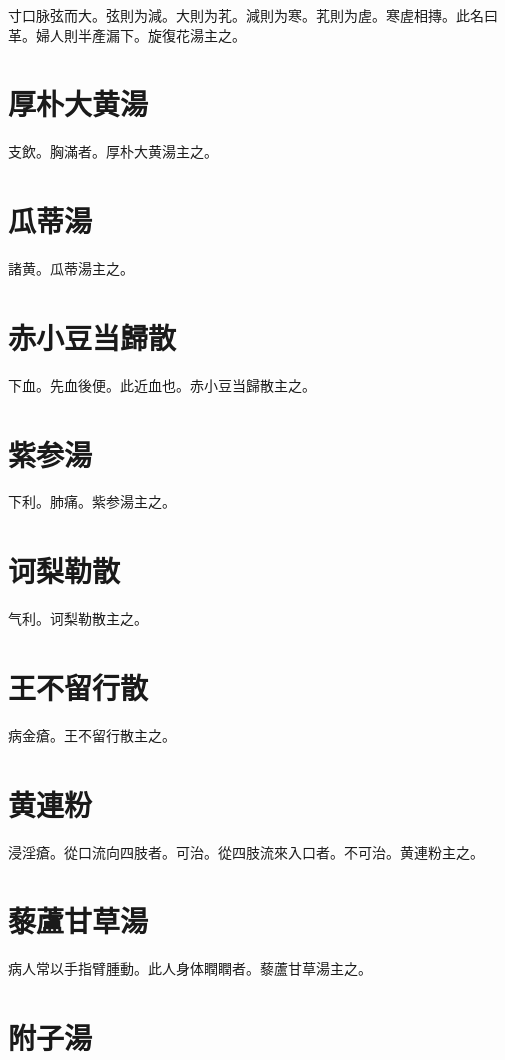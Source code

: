 \documentclass[12pt,twoside,UTF8,b5paper]{ctexbook}
\begin{document}
寸口脉弦而大。弦則为減。大則为芤。減則为寒。芤則为虗。寒虗相摶。此名曰革。婦人則半產漏下。旋復花湯主之。

\section{厚朴大黄湯}

支飲。胸滿者。厚朴大黄湯主之。

\section{瓜蒂湯}

諸黄。瓜蒂湯主之。

\section{赤小豆当歸散}

下血。先血後便。此近血也。赤小豆当歸散主之。

\section{紫参湯}

下利。肺痛。紫参湯主之。

\section{诃梨勒散}

气利。诃梨勒散主之。

\section{王不留行散}

病金瘡。王不留行散主之。

\section{黄連粉}

浸淫瘡。從口流向四肢者。可治。從四肢流來入口者。不可治。黄連粉主之。

\section{藜蘆甘草湯}

病人常以手指臂腫動。此人身体瞤瞤者。藜蘆甘草湯主之。

\section{附子湯}
\end{document}
